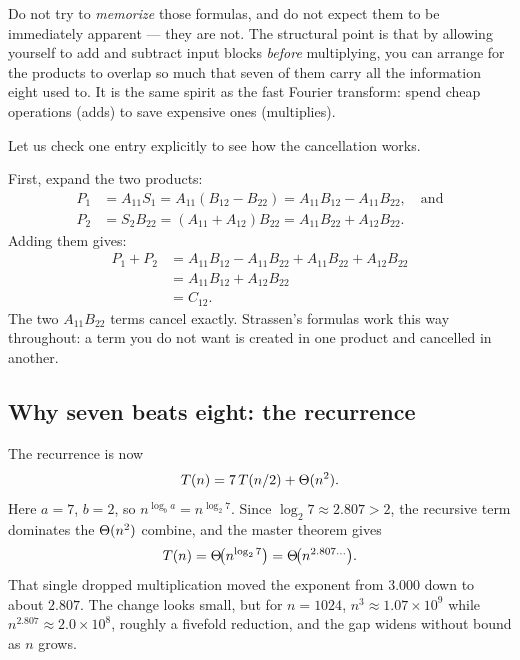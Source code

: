 \begin{intuitionbox}
Do not try to \emph{memorize} those formulas, and do not expect them to be
immediately apparent --- they are not. The structural point is that by
allowing yourself to add and subtract input blocks \emph{before} multiplying, you
can arrange for the products to overlap so much that seven of them carry all the
information eight used to. It is the same spirit as the fast Fourier transform:
spend cheap operations (adds) to save expensive ones (multiplies).
\end{intuitionbox}

Let us check one entry explicitly to see how the cancellation works.

\begin{example}[Verifying $C_{12}=P_1+P_2$]
\label{ch27:strassen-check}
First, expand the two products:
\begin{align*}
P_1 &= A_{11}S_1 = A_{11}(B_{12}-B_{22}) = A_{11}B_{12}-A_{11}B_{22}, \quad \text{and} \\
P_2 &= S_2B_{22} = (A_{11}+A_{12})B_{22} = A_{11}B_{22}+A_{12}B_{22}.
\end{align*}
Adding them gives:
\begin{align*}
P_1+P_2 &= A_{11}B_{12}-A_{11}B_{22}+A_{11}B_{22}+A_{12}B_{22} \\
        &= A_{11}B_{12}+A_{12}B_{22} \\
        &= C_{12}.
\end{align*}
The two $A_{11}B_{22}$ terms cancel exactly. Strassen's formulas work this
way throughout: a term you do not want is created in one product and cancelled in another.
\end{example}

\subsection{Why seven beats eight: the recurrence}

The recurrence is now
$$
T(n)=7\,T(n/2)+\Theta(n^2).
$$
Here $a=7$, $b=2$, so $n^{\log_b a}=n^{\log_2 7}$. Since $\log_2 7\approx 2.807>2$,
the recursive term dominates the $\Theta(n^2)$ combine, and the master theorem gives
$$
T(n)=\Theta\!\big(n^{\log_2 7}\big)=\Theta\!\big(n^{2.807\ldots}\big).
$$
That single dropped multiplication moved the exponent from $3.000$ down to about
$2.807$. The change looks small, but for $n=1024$, $n^3\approx 1.07\times 10^9$
while $n^{2.807}\approx 2.0\times 10^8$, roughly a fivefold reduction, and the gap
widens without bound as $n$ grows.

